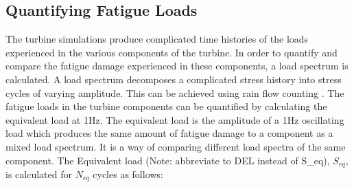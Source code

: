 

\subsection{Quantifying Fatigue Loads}
The turbine simulations produce complicated time histories of the loads experienced in the various components of the turbine. In order to quantify and compare the fatigue damage experienced in these components, a load spectrum is calculated. A load spectrum decomposes a complicated stress history into stress cycles of varying amplitude. This can be achieved using rain flow counting \cite{matsuishi1968fatigue}. The fatigue loads in the turbine components can be quantified by calculating the equivalent load at 1Hz. The equivalent load is the amplitude of a 1Hz oscillating load which produces the same amount of fatigue damage to a component as a mixed load spectrum. It is a way of comparing different load spectra of the same component. The Equivalent load (Note: abbreviate to DEL instead of S_eq), $S_{eq}$, is calculated for $N_{eq}$ cycles as follows:

